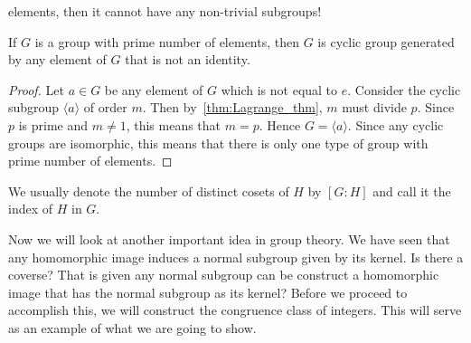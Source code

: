 elements, then it cannot have any non-trivial subgroups!
\begin{Corollary}
    If $G$ is a group with prime number of elements, then $G$ is cyclic group generated by any element of $G$
    that is not an identity.
\end{Corollary}
\begin{proof}
    Let $a \in G$ be any element of $G$ which is not equal to $e$. Consider the cyclic subgroup $\langle a
    \rangle$ of order $m$. Then by~\ref{thm:Lagrange_thm}, $m$ must divide $p$. Since $p$ is prime and $m \neq
    1$, this means that $m = p$. Hence $G = \langle a \rangle$. Since any cyclic groups are isomorphic, this
    means that there is only one type of group with prime number of elements.
\end{proof}
We usually denote the number of distinct cosets of $H$ by $\left[G:H\right]$ and call it the index of $H$ in
$G$.

Now we will look at another important idea in group theory. We have seen that any homomorphic image induces a
normal subgroup given by its kernel. Is there a coverse? That is given any normal subgroup can be construct a
homomorphic image that has the normal subgroup as its kernel? Before we proceed to accomplish this, 
we will construct the congruence class of
integers. This will serve as an example of what we are going to show. 

